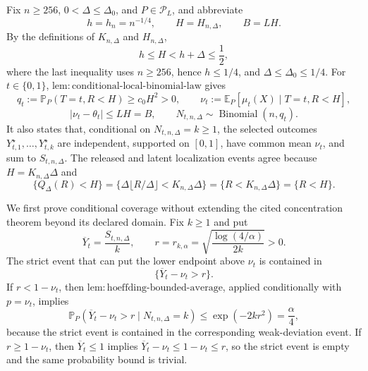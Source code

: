 Fix \(n\geq256\), \(0<\Delta\leq\Delta_0\), and \(P\in\mathcal P_L\), and abbreviate
\[
 h=h_n=n^{-1/4},\qquad H=H_{n,\Delta},\qquad B=LH.
\]
By the definitions of \(K_{n,\Delta}\) and \(H_{n,\Delta}\),
\[
 h\leq H<h+\Delta\leq\frac12,
\]
where the last inequality uses \(n\geq256\), hence \(h\leq1/4\), and \(\Delta\leq\Delta_0\leq1/4\).  For \(t\in\{0,1\}\), \(\mathrm{lem:conditional\text{-}local\text{-}binomial\text{-}law}\) gives
\[
 q_t:=\mathbb P_P(T=t,R<H)\geq c_0H^2>0,
 \qquad
 \nu_t:=\mathbb E_P[\mu_t(X)\mid T=t,R<H],
\]
\[
 |\nu_t-\theta_t|\leq LH=B,
 \qquad
 N_{t,n,\Delta}\sim\operatorname{Binomial}(n,q_t).
\]
It also states that, conditional on \(N_{t,n,\Delta}=k\geq1\), the selected outcomes \(Y_{t,1}^{\star},\ldots,Y_{t,k}^{\star}\) are independent, supported on \([0,1]\), have common mean \(\nu_t\), and sum to \(S_{t,n,\Delta}\).  The released and latent localization events agree because \(H=K_{n,\Delta}\Delta\) and
\[
 \{Q_\Delta(R)<H\}
 =\{\Delta\lfloor R/\Delta\rfloor<K_{n,\Delta}\Delta\}
 =\{R<K_{n,\Delta}\Delta\}
 =\{R<H\}.
\]

We first prove conditional coverage without extending the cited concentration theorem beyond its declared domain.  Fix \(k\geq1\) and put
\[
 \overline Y_t=\frac{S_{t,n,\Delta}}k,
 \qquad
 r=r_{k,\alpha}=\sqrt{\frac{\log(4/\alpha)}{2k}}>0.
\]
The strict event that can put the lower endpoint above \(\nu_t\) is contained in
\[
 \{\overline Y_t-\nu_t>r\}.
\]
If \(r<1-\nu_t\), then \(\mathrm{lem:hoeffding\text{-}bounded\text{-}average}\), applied conditionally with \(p=\nu_t\), implies
\[
 \mathbb P_P(\overline Y_t-\nu_t>r\mid N_{t,n,\Delta}=k)
 \leq \exp(-2kr^2)=\frac\alpha4,
\]
because the strict event is contained in the corresponding weak-deviation event.  If \(r\geq1-\nu_t\), then \(\overline Y_t\leq1\) implies \(\overline Y_t-\nu_t\leq1-\nu_t\leq r\), so the strict event is empty and the same probability bound is trivial.

